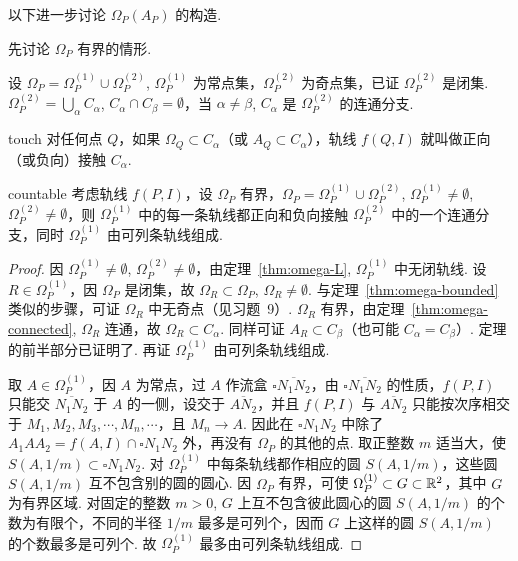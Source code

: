 以下进一步讨论 $\Omega_P(A_P)$ 的构造.

先讨论 $\Omega_P$ 有界的情形.

设 $\Omega_P = \Omega_P^{(1)} \cup \Omega_P^{(2)}$, $\Omega_P^{(1)}$ 为常点集，$\Omega_P^{(2)}$ 为奇点集，已证 $\Omega_P^{(2)}$ 是闭集. $\Omega_P^{(2)} = \bigcup_\alpha C_\alpha$, $C_\alpha \cap C_\beta = \emptyset$，当 $\alpha \neq \beta$, $C_\alpha$ 是 $\Omega_P^{(2)}$ 的连通分支.

\begin{definition}{}{touch}
对任何点 $Q$，如果 $\Omega_Q \subset C_\alpha$（或 $A_Q \subset C_\alpha$），轨线 $f(Q, I)$ 就叫做正向（或负向）接触 $C_\alpha$.
\end{definition}

\begin{theorem}{}{countable}
考虑轨线 $f(P, I)$，设 $\Omega_P$ 有界，$\Omega_P = \Omega_P^{(1)} \cup \Omega_P^{(2)}$, $\Omega_P^{(1)} \neq \emptyset$, $\Omega_P^{(2)} \neq \emptyset$，则 $\Omega_P^{(1)}$ 中的每一条轨线都正向和负向接触 $\Omega_P^{(2)}$ 中的一个连通分支，同时 $\Omega_P^{(1)}$ 由可列条轨线组成.
\end{theorem}

\begin{proof}
因 $\Omega_P^{(1)} \neq \emptyset$, $\Omega_P^{(2)} \neq \emptyset$，由定理~\ref{thm:omega-L}, $\Omega_P^{(1)}$ 中无闭轨线. 设 $R \in \Omega_P^{(1)}$，因 $\Omega_P$ 是闭集，故 $\Omega_R \subset \Omega_P$, $\Omega_R \neq \emptyset$. 与定理~\ref{thm:omega-bounded} 类似的步骤，可证 $\Omega_R$ 中无奇点（见习题~9）. $\Omega_R$ 有界，由定理~\ref{thm:omega-connected}, $\Omega_R$ 连通，故 $\Omega_R \subset C_\alpha$. 同样可证 $A_R \subset C_\beta$（也可能 $C_\alpha = C_\beta$）. 定理的前半部分已证明了. 再证 $\Omega_P^{(1)}$ 由可列条轨线组成.

取 $A \in \Omega_P^{(1)}$，因 $A$ 为常点，过 $A$ 作流盒 $\square \overline{N_1N_2}$，由 $\square \overline{N_1N_2}$ 的性质，$f(P, I)$ 只能交 $\overline{N_1N_2}$ 于 $A$ 的一侧，设交于 $\overline{AN_2}$，并且 $f(P, I)$ 与 $\overline{AN_2}$ 只能按次序相交于 $M_1, M_2, M_3, \cdots, M_n, \cdots$，且 $M_n \to A$. 因此在 $\square N_1N_2$ 中除了 $A_1AA_2 = f(A, I) \cap \square N_1N_2$ 外，再没有 $\Omega_P$ 的其他的点. 取正整数 $m$ 适当大，使 $S(A, 1/m) \subset \square N_1N_2$. 对 $\Omega_P^{(1)}$ 中每条轨线都作相应的圆 $S(A, 1/m)$，这些圆 $S(A, 1/m)$ 互不包含别的圆的圆心. 因 $\Omega_P$ 有界，可使 $\Omega_P^{(1)} \subset G \subset \mathbb{R}^2$，其中 $G$ 为有界区域. 对固定的整数 $m > 0$, $G$ 上互不包含彼此圆心的圆 $S(A, 1/m)$ 的个数为有限个，不同的半径 $1/m$ 最多是可列个，因而 $G$ 上这样的圆 $S(A, 1/m)$ 的个数最多是可列个. 故 $\Omega_P^{(1)}$ 最多由可列条轨线组成.
\end{proof}

